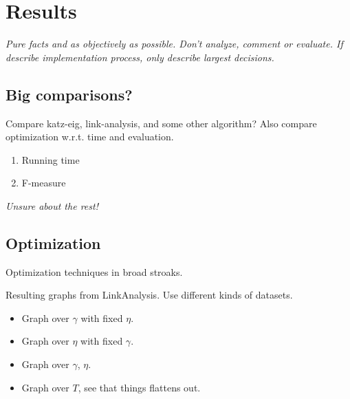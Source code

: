 \chapter{Results}\label{cha:Results}

\textit{Pure facts and as objectively as possible. Don't analyze, comment or evaluate.  If describe implementation process, only describe largest decisions.}


\newpage


\newpage



\newpage


\newpage


\newpage


\newpage




\section{Big comparisons?}

Compare katz-eig, link-analysis, and some other algorithm?
Also compare optimization w.r.t. time and evaluation.

\begin{enumerate}
    \item Running time
    \item F-measure
\end{enumerate}


\textit{Unsure about the rest!}

\section{Optimization}\label{sec:res:opt}

Optimization techniques in broad stroaks.

Resulting graphs from LinkAnalysis. Use different kinds of datasets.

\begin{itemize}
    \item Graph over $\gamma$ with fixed $\eta$.
    \item Graph over $\eta$ with fixed $\gamma$.
    \item Graph over $\gamma$, $\eta$.
    \item Graph over $T$, see that things flattens out.
\end{itemize}


